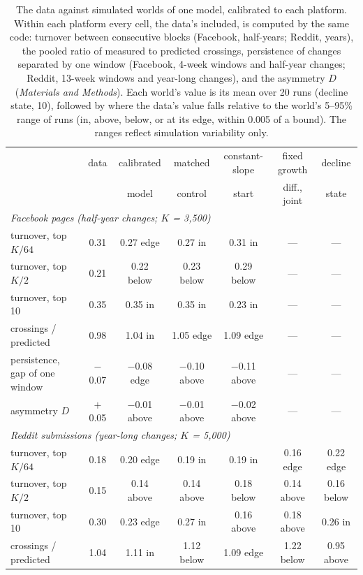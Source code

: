 \documentclass[9pt,twocolumn,twoside]{pnas-new}
\begin{document}
\begin{table}[tbp]\centering
\caption{The data against simulated worlds of one model, calibrated to each platform. Within each platform every cell, the data's included, is computed by the same code: turnover between consecutive blocks (Facebook, half-years; Reddit, years), the pooled ratio of measured to predicted crossings, persistence of changes separated by one window (Facebook, 4-week windows and half-year changes; Reddit, 13-week windows and year-long changes), and the asymmetry $D$ (\textit{Materials and Methods}). Each world's value is its mean over 20 runs (decline state, 10), followed by where the data's value falls relative to the world's 5--95\% range of runs (in, above, below, or at its edge, within 0.005 of a bound). The ranges reflect simulation variability only.}
\label{tab:atlas}
\footnotesize\setlength{\tabcolsep}{3pt}
\begin{tabular}{lcccccc}
 & data & calibrated & matched & constant-slope & fixed growth & decline \\
 & & model & control & start & diff., joint & state \\
\hline
\multicolumn{7}{l}{\textit{Facebook pages (half-year changes; $K$ = 3,500)}}\\
turnover, top $K/64$ & 0.31 & 0.27 edge & 0.27 in & 0.31 in & --- & --- \\
turnover, top $K/2$ & 0.21 & 0.22 below & 0.23 below & 0.29 below & --- & --- \\
turnover, top 10 & 0.35 & 0.35 in & 0.35 in & 0.23 in & --- & --- \\
crossings / predicted & 0.98 & 1.04 in & 1.05 edge & 1.09 edge & --- & --- \\
persistence, gap of one window & $-$0.07 & $-$0.08 edge & $-$0.10 above & $-$0.11 above & --- & --- \\
asymmetry $D$ & $+$0.05 & $-$0.01 above & $-$0.01 above & $-$0.02 above & --- & --- \\
\hline
\multicolumn{7}{l}{\textit{Reddit submissions (year-long changes; $K$ = 5,000)}}\\
turnover, top $K/64$ & 0.18 & 0.20 edge & 0.19 in & 0.19 in & 0.16 edge & 0.22 edge \\
turnover, top $K/2$ & 0.15 & 0.14 above & 0.14 above & 0.18 below & 0.14 above & 0.16 below \\
turnover, top 10 & 0.30 & 0.23 edge & 0.27 in & 0.16 above & 0.18 above & 0.26 in \\
crossings / predicted & 1.04 & 1.11 in & 1.12 below & 1.09 edge & 1.22 below & 0.95 above \\

\end{tabular}
\end{table}
\end{document}
